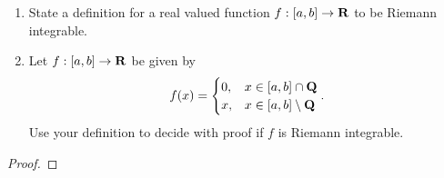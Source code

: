 \documentclass[11pt,twoside,openany]{memoir}
\begin{document}
\newpage
\fancyhead[L]{\scalebox{0.9}{Integration}}
\fancyhead[R]{\scalebox{0.9}{Appeared on: W24}}
\begin{problem}
    \phantom{a}
    \begin{enumerate}[label = (\arabic*)]
        \item State a definition for a real valued function $f:[a,b] \rightarrow \mathbf{R}$ to be Riemann integrable.
        \item Let $f:[a,b] \rightarrow \mathbf{R}$ be given by 
            \begin{equation*}
            \begin{split}
                f(x) = 
                \begin{cases}
                    0,& x \in [a,b] \cap \mathbf{Q} \\
                    x,& x \in [a,b] \setminus \mathbf{Q}
                \end{cases}.
            \end{split}
            \end{equation*}
        Use your definition to decide with proof if $f$ is Riemann integrable.
    \end{enumerate}
\end{problem}
\begin{proof}
\end{proof}
\end{document}

